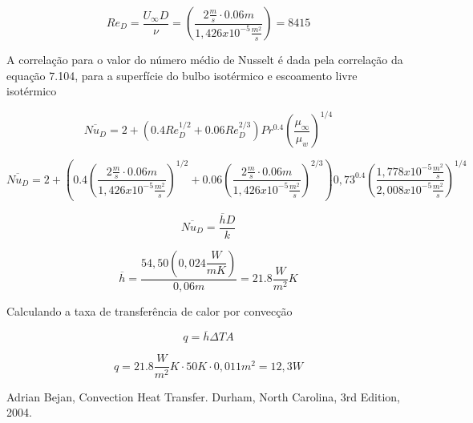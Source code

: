 \documentclass[12pt]{article}
\begin{document}
\begin{equation}
	Re_{D} =  \frac{U_\infty D}{\nu} = \left(  \frac{2 \frac{m}{s} \cdotp 0.06m}{1,426 x 10^{-5}\frac{m^2}{s}}\right) = 8415
\end{equation}

A correlação para o valor do número médio de Nusselt é dada pela correlação da equação 7.104, para a superfície do bulbo isotérmico e escoamento livre isotérmico


\begin{equation}
	\overline{Nu_D} = 2 + \left( 0.4 Re_D^{1/2} + 0.06 Re_D^{2/3} \right) Pr^{0.4} \left( \frac{\mu_\infty}{\mu_w} \right)^{1/4}
\end{equation}


\begin{equation}
	\overline{Nu_D} = 2 + \left( 0.4 \left(  \frac{2 \frac{m}{s} \cdotp 0.06m}{1,426 x 10^{-5}\frac{m^2}{s}}\right)^{1/2} + 0.06 \left(  \frac{2 \frac{m}{s} \cdotp 0.06m}{1,426 x 10^{-5}\frac{m^2}{s}}\right)^{2/3} \right) 0,73^{0.4} \left( \frac{1,778x10^{-5}\frac{m^{2}}{s}}{2,008x10^{-5}\frac{m^{2}}{s}} \right)^{1/4}
\end{equation}

\begin{equation}
	\overline{Nu_D} =  \frac{\overline{h} D}{k}
\end{equation}

\begin{equation}
	\overline{h} = \frac{54,50 (0,024\dfrac{W}{mK})}{0,06m} = 21.8 \frac{W}{m^2}K
\end{equation}

Calculando a taxa de transferência de calor por convecção

\begin{equation}
	q = \overline{h}\Delta T A
\end{equation}


\begin{equation}
	q =  21.8 \frac{W}{m^2}K \cdotp50K \cdotp 0,011 m^{2} = 12,3 W
\end{equation}

\begin{thebibliography}{999}
	
	
	Adrian Bejan,
	Convection Heat Transfer.
	Durham, North Carolina,
	3rd Edition,
	2004.
	
	
\end{thebibliography}
\end{document}

